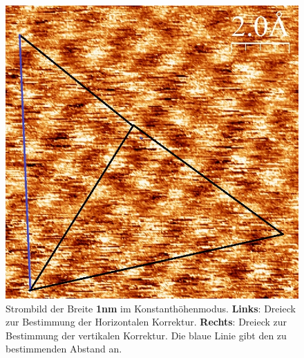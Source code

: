 \documentclass[12pt,a4paper]{article}
\begin{document}
\begin{figure}[H]
\includegraphics[scale=0.36]{Bilder/Atome/hoch1_v.jpg}
\caption{Strombild der Breite \textbf{1nm} im Konstanthöhenmodus. \textbf{Links}: Dreieck zur Bestimmung der Horizontalen Korrektur. \textbf{Rechts}: Dreieck zur Bestimmung der vertikalen Korrektur. Die blaue Linie gibt den zu bestimmenden Abstand an.}
\end{figure}
\end{document}
